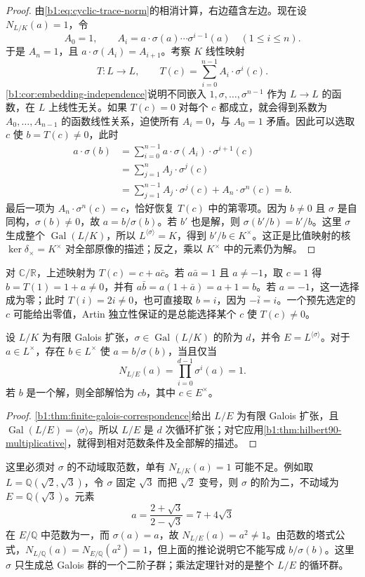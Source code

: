 \begin{proof}
	由\eqref{b1:eq:cyclic-trace-norm}的相消计算，右边蕴含左边。现在设 \(N_{L/K}(a)=1\)，令
	\[
		A_0=1,\qquad A_i=a\cdot\sigma(a)\cdots\sigma^{i-1}(a)\quad(1\leq i\leq n).
	\]
	于是 \(A_n=1\)，且 \(a\cdot\sigma(A_i)=A_{i+1}\)。考察 \(K\) 线性映射
	\[
		T:L\longrightarrow L,\qquad T(c)=\sum_{i=0}^{n-1}A_i\cdot\sigma^i(c).
	\]
	\cref{b1:cor:embedding-independence}说明不同嵌入 \(1,\sigma,\ldots,\sigma^{n-1}\) 作为 \(L\to L\) 的函数，在 \(L\) 上线性无关。如果 \(T(c)=0\) 对每个 \(c\) 都成立，就会得到系数为 \(A_0,\ldots,A_{n-1}\) 的函数线性关系，迫使所有 \(A_i=0\)，与 \(A_0=1\) 矛盾。因此可以选取 \(c\) 使 \(b=T(c)\neq0\)，此时
	\[
		\begin{aligned}
			a\cdot\sigma(b) &=\sum_{i=0}^{n-1}a\cdot\sigma(A_i)\cdot\sigma^{i+1}(c)\\
			&=\sum_{j=1}^{n}A_j\cdot\sigma^j(c)\\
			&=\sum_{j=1}^{n-1}A_j\cdot\sigma^j(c)+A_n\cdot\sigma^n(c)=b.
		\end{aligned}
	\]
	最后一项为 \(A_n\cdot\sigma^n(c)=c\)，恰好恢复 \(T(c)\) 中的第零项。因为 \(b\ne0\) 且 \(\sigma\) 是自同构，\(\sigma(b)\ne0\)，故 \(a=b/\sigma(b)\)。若 \(b'\) 也是解，则 \(\sigma(b'/b)=b'/b\)。这里 \(\sigma\) 生成整个 \(\operatorname{Gal}(L/K)\)，所以 \(L^{\langle\sigma\rangle}=K\)，得到 \(b'/b\in K^\times\)。这正是比值映射的核 \(\ker\delta_\times=K^\times\) 对全部原像的描述；反之，乘以 \(K^\times\) 中的元素仍为解。
\end{proof}

对 \(\mathbb C/\mathbb R\)，上述映射为 \(T(c)=c+a\bar c\)。若 \(a\bar a=1\) 且 \(a\neq-1\)，取 \(c=1\) 得 \(b=T(1)=1+a\ne0\)，并有 \(a\bar b=a(1+\bar a)=a+1=b\)。若 \(a=-1\)，这一选择成为零；此时 \(T(i)=2i\ne0\)，也可直接取 \(b=i\)，因为 \(-\bar i=i\)。一个预先选定的 \(c\) 可能给出零值，Artin 独立性保证的是总能选择某个 \(c\) 使 \(T(c)\ne0\)。

\begin{corollary}\label{b1:cor:hilbert90-cyclic-subgroup}
	设 \(L/K\) 为有限 Galois 扩张，\(\sigma\in\operatorname{Gal}(L/K)\) 的阶为 \(d\)，并令 \(E=L^{\langle\sigma\rangle}\)。对于 \(a\in L^\times\)，存在 \(b\in L^\times\) 使 \(a=b/\sigma(b)\)，当且仅当
	\[
		N_{L/E}(a)=\prod_{i=0}^{d-1}\sigma^i(a)=1.
	\]
	若 \(b\) 是一个解，则全部解恰为 \(cb\)，其中 \(c\in E^\times\)。
\end{corollary}
\begin{proof}
	\cref{b1:thm:finite-galois-correspondence}给出 \(L/E\) 为有限 Galois 扩张，且 \(\operatorname{Gal}(L/E)=\langle\sigma\rangle\)。所以 \(L/E\) 是 \(d\) 次循环扩张；对它应用\cref{b1:thm:hilbert90-multiplicative}，就得到相对范数条件及全部解的描述。
\end{proof}
这里必须对 \(\sigma\) 的不动域取范数，单有 \(N_{L/K}(a)=1\) 可能不足。例如取 \(L=\mathbb Q(\sqrt2,\sqrt3)\)，令 \(\sigma\) 固定 \(\sqrt3\) 而把 \(\sqrt2\) 变号，则 \(\sigma\) 的阶为二，不动域为 \(E=\mathbb Q(\sqrt3)\)。元素
\[
	a=\frac{2+\sqrt3}{2-\sqrt3}=7+4\sqrt3
\]
在 \(E/\mathbb Q\) 中范数为一，而 \(\sigma(a)=a\)，故 \(N_{L/E}(a)=a^2\ne1\)。由范数的塔式公式，\(N_{L/\mathbb Q}(a)=N_{E/\mathbb Q}(a^2)=1\)，但上面的推论说明它不能写成 \(b/\sigma(b)\)。这里 \(\sigma\) 只生成总 Galois 群的一个二阶子群；乘法定理针对的是整个 \(L/E\) 的循环群。

